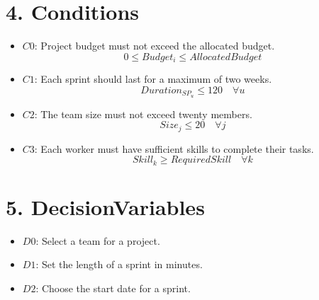 \documentclass{article}
\begin{document}
\section*{4. Conditions}
\begin{itemize}
    \item $C0$: Project budget must not exceed the allocated budget.
        \[
        0 \leq Budget_i \leq AllocatedBudget
        \]
    \item $C1$: Each sprint should last for a maximum of two weeks.
        \[
        Duration_{SP_u} \leq 120 \quad \forall u
        \]
    \item $C2$: The team size must not exceed twenty members.
        \[
        Size_j \leq 20 \quad \forall j
        \]
    \item $C3$: Each worker must have sufficient skills to complete their tasks.
        \[
        Skill_k \geq RequiredSkill \quad \forall k
        \]
\end{itemize}

\section*{5. DecisionVariables}
\begin{itemize}
    \item $D0$: Select a team for a project.
    \item $D1$: Set the length of a sprint in minutes.
    \item $D2$: Choose the start date for a sprint.
\end{itemize}
\end{document}
